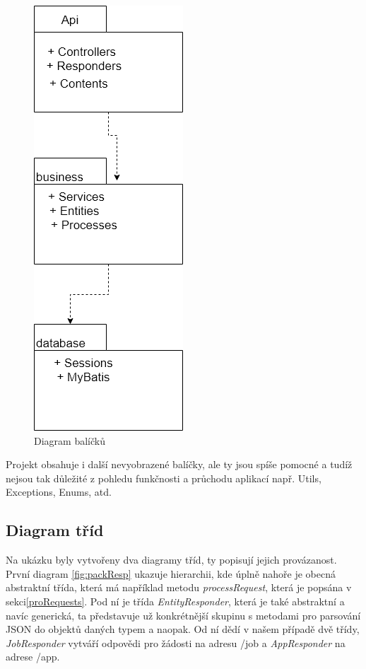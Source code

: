\begin{figure}[H]
	\includegraphics[scale=0.5]{packages}
	\centering
	\caption{Diagram balíčků}
	\label{fig:pack}
\end{figure}

Projekt obsahuje i další nevyobrazené balíčky, ale ty jsou spíše pomocné a tudíž nejsou tak důležité z pohledu funkčnosti a průchodu aplikací např. Utils, Exceptions, Enums, atd.

\subsection{Diagram tříd}
Na ukázku byly vytvořeny dva diagramy tříd, ty popisují jejich provázanost. První diagram \ref{fig:packResp} ukazuje hierarchii, kde úplně nahoře je obecná abstraktní třída, která má například metodu \textit{processRequest}, která je popsána v sekci\ref{proRequests}. Pod ní je třída \textit{EntityResponder}, která je také abstraktní a navíc generická, ta představuje už konkrétnější skupinu s metodami pro parsování JSON do objektů daných typem a naopak. Od ní dědí v našem případě dvě třídy, \textit{JobResponder} vytváří odpovědi pro žádosti na adresu /job a \textit{AppResponder} na adrese /app. 

